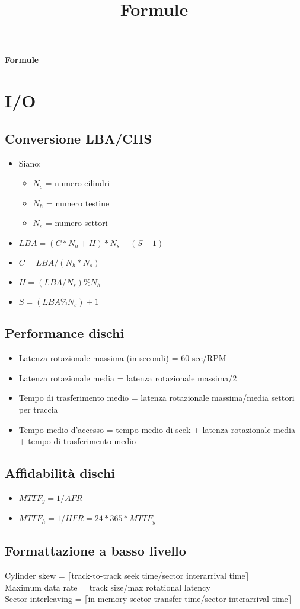 \documentclass[10pt]{article}
\title{Formule}
\begin{document}
\begin{center}
    \large\textbf{Formule}
\end{center}
\section{I/O}
\subsection*{Conversione LBA/CHS}
\begin{itemize}
    \item Siano:
    \begin{itemize}
        \item $N_c$ = numero cilindri
        \item $N_h$ = numero testine
        \item $N_s$ = numero settori
    \end{itemize}
    \item $LBA=(C*N_h+H)*N_s+(S-1)$
    \item $C=LBA/(N_h*N_s)$
    \item $H=(LBA/N_s)\%N_h$
    \item $S=(LBA\%N_s)+1$
\end{itemize}
\subsection*{Performance dischi}
\begin{itemize}
    \item Latenza rotazionale massima (in secondi) = 60 sec/RPM
    \item Latenza rotazionale media = latenza rotazionale massima/2
    \item Tempo di trasferimento medio = latenza rotazionale massima/media settori per traccia
    \item Tempo medio d'accesso = tempo medio di seek + latenza rotazionale media + tempo di trasferimento medio
\end{itemize}
\subsection*{Affidabilità dischi}
\begin{itemize}
    \item $MTTF_y=1/AFR$
    \item $MTTF_h=1/HFR=24*365*MTTF_y$
\end{itemize}
\subsection*{Formattazione a basso livello}
Cylinder skew = $\lceil$track-to-track seek time/sector interarrival time$\rceil$\\
Maximum data rate = track size/max rotational latency\\
Sector interleaving = $\lceil$in-memory sector transfer time/sector interarrival time$\rceil$
\end{document}
